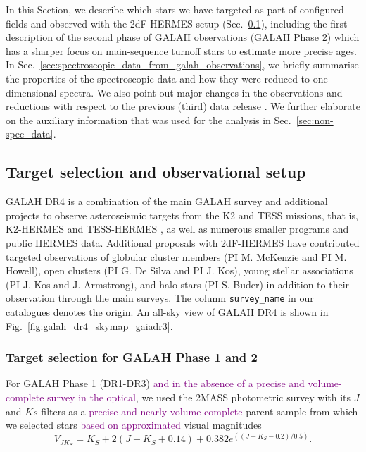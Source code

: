 \documentclass[
  journal=pasa,
  manuscript=research-paper, %
  year=2024,
  volume=37
]{cup-journal}
\newcommand{\adjusted}[1]{{\textcolor{purple}{#1}}}
\begin{document}
In this Section, we describe which stars we have targeted as part of configured fields \citep{Miszalski2006} and observed with the 2dF-HERMES setup (Sec.~\ref{sec:target_selection_observations}), including the first description of the second phase of GALAH observations (GALAH Phase 2) which has a sharper focus on main-sequence turnoff stars to estimate more precise ages. In Sec.~\ref{sec:spectroscopic_data_from_galah_observations}, we briefly summarise the properties of the spectroscopic data and how they were reduced to one-dimensional spectra. We also point out major changes in the observations and reductions with respect to the previous (third) data release \citep{Buder2021}. We further elaborate on the auxiliary information that was used for the analysis in Sec.~\ref{sec:non-spec_data}.

\subsection{Target selection and observational setup} \label{sec:target_selection_observations}

GALAH DR4 is a combination of the main GALAH survey and additional projects to observe asteroseismic targets from the K2 \citep{Howell2014} and TESS \citep{Ricker2015} missions, that is, K2-HERMES \citep{Sharma2019} and TESS-HERMES \citep{Sharma2018}, as well as numerous smaller programs and public HERMES data. Additional proposals with 2dF-HERMES have contributed targeted observations of globular cluster members (PI M. McKenzie and PI M. Howell), open clusters (PI G. De Silva and PI J. Kos), young stellar associations (PI J. Kos and J. Armstrong), and halo stars (PI S. Buder) in addition to their observation through the main surveys. The column \texttt{survey\_name} in our catalogues denotes the origin. An all-sky view of GALAH DR4 is shown in Fig.~\ref{fig:galah_dr4_skymap_gaiadr3}.

\subsubsection{Target selection for GALAH Phase 1 and 2}

For GALAH Phase 1 (DR1-DR3) \adjusted{and in the absence of a precise and volume-complete survey in the optical}, we used the 2MASS photometric survey \citep{Skrutskie2006} with its $J$ and $Ks$ filters as a \adjusted{precise and nearly volume-complete} parent sample from which we selected stars \adjusted{based on approximated \citep{DeSilva2015}} visual magnitudes
\begin{equation}
V_{JK_S} = K_S+2(J-K_S+0.14)+0.382e^{((J-K_S-0.2)/0.5)}.
\end{equation}
\end{document}
